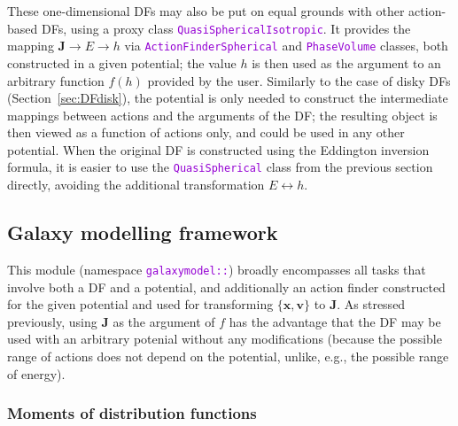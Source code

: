 \documentclass[12pt]{article}
\newcommand{\ttt}[1]{\textcolor{darkviolet}{\texttt{#1}}}
\newcommand{\bv}{\boldsymbol{v}}
\newcommand{\bx}{\boldsymbol{x}}
\newcommand{\bJ}{\boldsymbol{J}}
\begin{document}
These one-dimensional DFs may also be put on equal grounds with other action-based DFs, using a proxy class \ttt{QuasiSphericalIsotropic}. It provides the mapping $\bJ \to E \to h$ via \ttt{ActionFinderSpherical} and \ttt{PhaseVolume} classes, both constructed in a given potential; the value $h$ is then used as the argument to an arbitrary function $f(h)$ provided by the user. Similarly to the case of disky DFs (Section~\ref{sec:DFdisk}), the potential is only needed to construct the intermediate mappings between actions and the arguments of the DF; the resulting object is then viewed as a function of actions only, and could be used in any other potential.
When the original DF is constructed using the Eddington inversion formula, it is easier to use the \ttt{QuasiSpherical} class from the previous section directly, avoiding the additional transformation $E\leftrightarrow h$.

\subsection{Galaxy modelling framework}  \label{sec:GalaxyModel}

This module (namespace \ttt{galaxymodel::}) broadly encompasses all tasks that involve both a DF and a potential, and additionally an action finder constructed for the given potential and used for transforming $\{\bx,\bv\}$ to $\bJ$.
As stressed previously, using $\bJ$ as the argument of $f$ has the advantage that the DF may be used with an arbitrary potenial without any modifications (because the possible range of actions does not depend on the potential, unlike, e.g., the possible range of energy).

\subsubsection{Moments of distribution functions}  \label{sec:Moments}
\end{document}
